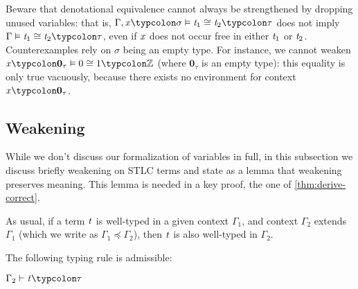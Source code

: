 \iftoggle{full}{
\denotEqual
}{
\begin{restatable}[Denotational equivalence]{definition}{denotEqual}
  \label{def:denot-equivalence}
  We say that two terms \ensuremath{\Gamma\vdash\Varid{t}_{1}\typcolon\tau} and \ensuremath{\Gamma\vdash\Varid{t}_{2}\typcolon\tau} are denotationally equal, and write \ensuremath{\Gamma\vDash\Varid{t}_{1}\cong\Varid{t}_{2}\typcolon\tau} (or sometimes \ensuremath{\Varid{t}_{1}\cong\Varid{t}_{2}}), if for all environments
  \ensuremath{\rho\typcolon\Eval{\Gamma}} we have that \ensuremath{\Eval{\Varid{t}_{1}}\;\rho\mathrel{=}\Eval{\Varid{t}_{2}}\;\rho}.
\end{restatable}
}
\begin{remark}
  Beware that denotational equivalence cannot always be strengthened
  by dropping unused variables:
  that is, \ensuremath{\Gamma,\Varid{x}\typcolon\sigma\vDash\Varid{t}_{1}\cong\Varid{t}_{2}\typcolon\tau} does not
  imply \ensuremath{\Gamma\vDash\Varid{t}_{1}\cong\Varid{t}_{2}\typcolon\tau}, even if \ensuremath{\Varid{x}} does not
  occur free in either \ensuremath{\Varid{t}_{1}} or \ensuremath{\Varid{t}_{2}}. Counterexamples
  rely on \ensuremath{\sigma} being an empty type. For instance, we cannot weaken
  \ensuremath{\Varid{x}\typcolon\mathbf{0}_\tau\vDash\mathrm{0}\cong\mathrm{1}\typcolon\mathbb{Z}} (where \ensuremath{\mathbf{0}_\tau} is an
  empty type): this equality is only true vacuously, because
  there exists no environment for context \ensuremath{\Varid{x}\typcolon\mathbf{0}_\tau}.
\end{remark}

\subsection{Weakening}
While we don't discuss our formalization of variables in full, in
this subsection we discuss briefly weakening on STLC terms and
state as a lemma that weakening preserves meaning. This lemma is needed in
a key proof, the one of \cref{thm:derive-correct}.

As usual, if a term \ensuremath{\Varid{t}} is well-typed in a given context
\ensuremath{\Gamma_{1}}, and context \ensuremath{\Gamma_{2}} extends \ensuremath{\Gamma_{1}} (which we
write as \ensuremath{\Gamma_{1}\preceq\Gamma_{2}}), then \ensuremath{\Varid{t}} is also well-typed in
\ensuremath{\Gamma_{2}}.
\begin{lemma}
  \label{lem:weakening}
  The following typing rule is admissible:
\begin{typing}
  {\ensuremath{\Gamma_{2}\vdash\Varid{t}\typcolon\tau}}
\end{typing}
\end{lemma}

